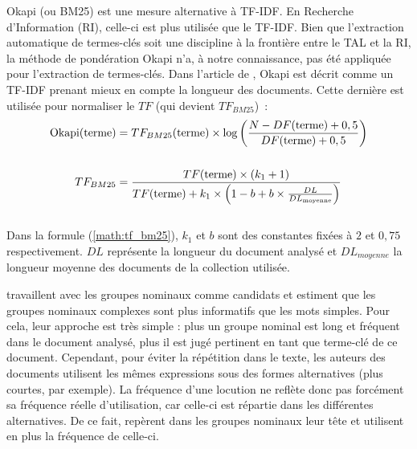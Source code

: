         Okapi (ou BM25) \cite{robertson1999okapi} est une mesure alternative
        à TF-IDF. En Recherche d'Information (RI), celle-ci est plus utilisée
        que le TF-IDF. Bien que l'extraction automatique de termes-clés soit
        une discipline à la frontière entre le TAL et la RI, la méthode de
        pondération Okapi n'a, à notre connaissance, pas été appliquée pour
        l'extraction de termes-clés. Dans l'article de
        , Okapi est décrit comme un TF-IDF
        prenant mieux en compte la longueur des documents. Cette dernière est
        utilisée pour normaliser le $TF$ (qui devient $TF_{BM25}$)~:
        \begin{align}
          \text{Okapi}(\text{terme}) &= TF_{BM25}(\text{terme}) \times \log\left(\frac{N - DF(\text{terme}) + 0,5}{DF(\text{terme}) + 0,5}\right) \label{math:okapi}\\
          \notag\\
          TF_{BM25} &= \frac{TF(\text{terme}) \times (k_1 + 1)}{TF(\text{terme}) + k_1 \times \left(1 - b + b \times \frac{DL}{DL_{\text{moyenne}}}\right)} \label{math:tf_bm25}
        \end{align}\\
        Dans la formule (\ref{math:tf_bm25}), $k_1$ et $b$ sont des constantes
        fixées à $2$ et $0,75$ respectivement. $DL$ représente la longueur du
        document analysé et $DL_{moyenne}$ la longueur moyenne des documents
        de la collection utilisée.

         travaillent avec les groupes nominaux
        comme candidats et estiment que les groupes nominaux complexes sont
        plus informatifs que les mots simples. Pour cela, leur approche est
        très simple : plus un groupe nominal est long et fréquent dans le
        document analysé, plus il est jugé pertinent en tant que terme-clé de
        ce document. Cependant, pour éviter la répétition dans le texte, les
        auteurs des documents utilisent les mêmes expressions sous des formes
        alternatives (plus courtes, par exemple). La fréquence d'une locution
        ne reflète donc pas forcément sa fréquence réelle d'utilisation, car
        celle-ci est répartie dans les différentes alternatives. De ce fait,
         repèrent dans les groupes nominaux
        leur tête et utilisent en plus la fréquence de celle-ci.

